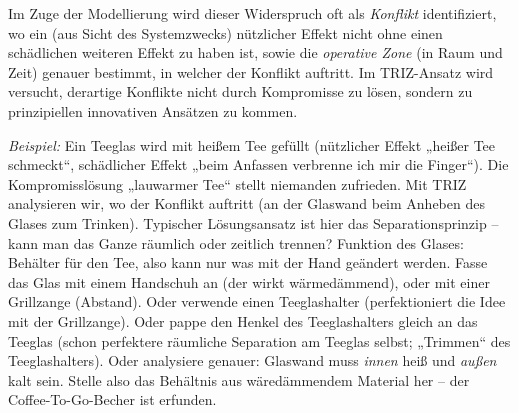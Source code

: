 \documentclass[11pt,a4paper]{article}
\begin{document}
Im Zuge der Modellierung wird dieser Widerspruch oft als \emph{Konflikt}
identifiziert, wo ein (aus Sicht des Systemzwecks) nützlicher Effekt nicht
ohne einen schädlichen weiteren Effekt zu haben ist, sowie die \emph{operative
  Zone} (in Raum und Zeit) genauer bestimmt, in welcher der Konflikt auftritt.
Im TRIZ-Ansatz wird versucht, derartige Konflikte nicht durch Kompromisse zu
lösen, sondern zu prinzipiellen innovativen Ansätzen zu kommen.

\emph{Beispiel:} Ein Teeglas wird mit heißem Tee gefüllt (nützlicher Effekt
„heißer Tee schmeckt“, schädlicher Effekt „beim Anfassen verbrenne ich mir die
Finger“).  Die Kompromisslösung „lauwarmer Tee“ stellt niemanden zufrieden.
Mit TRIZ analysieren wir, wo der Konflikt auftritt (an der Glaswand beim
Anheben des Glases zum Trinken). Typischer Lösungsansatz ist hier das
Separationsprinzip -- kann man das Ganze räumlich oder zeitlich trennen?
Funktion des Glases: Behälter für den Tee, also kann nur was mit der Hand
geändert werden. Fasse das Glas mit einem Handschuh an (der wirkt
wärmedämmend), oder mit einer Grillzange (Abstand). Oder verwende einen
Teeglashalter (perfektioniert die Idee mit der Grillzange).  Oder pappe den
Henkel des Teeglashalters gleich an das Teeglas (schon perfektere räumliche
Separation am Teeglas selbst; „Trimmen“ des Teeglashalters).  Oder analysiere
genauer: Glaswand muss \emph{innen} heiß und \emph{außen} kalt sein.  Stelle
also das Behältnis aus wäredämmendem Material her -- der Coffee-To-Go-Becher
ist erfunden.
\end{document}
